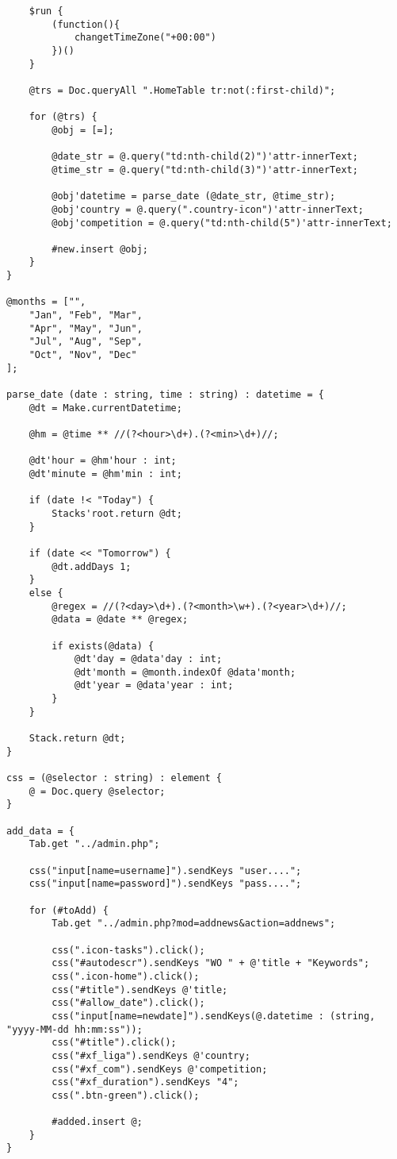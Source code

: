 \begin{lstlisting}
	$run {
		(function(){
			changetTimeZone("+00:00")
		})()
	}

	@trs = Doc.queryAll ".HomeTable tr:not(:first-child)";

	for (@trs) {
		@obj = [=];

		@date_str = @.query("td:nth-child(2)")'attr-innerText;
		@time_str = @.query("td:nth-child(3)")'attr-innerText;

		@obj'datetime = parse_date (@date_str, @time_str);
		@obj'country = @.query(".country-icon")'attr-innerText;
		@obj'competition = @.query("td:nth-child(5")'attr-innerText;

		#new.insert @obj;
	}
}

@months = ["",
	"Jan", "Feb", "Mar",
	"Apr", "May", "Jun",
	"Jul", "Aug", "Sep",
	"Oct", "Nov", "Dec"
];

parse_date (date : string, time : string) : datetime = {
	@dt = Make.currentDatetime;

	@hm = @time ** //(?<hour>\d+).(?<min>\d+)//;

	@dt'hour = @hm'hour : int;
	@dt'minute = @hm'min : int;

	if (date !< "Today") {
		Stacks'root.return @dt;
	}

	if (date << "Tomorrow") {
		@dt.addDays 1;
	}
	else {
		@regex = //(?<day>\d+).(?<month>\w+).(?<year>\d+)//;
		@data = @date ** @regex;

		if exists(@data) {
			@dt'day = @data'day : int;
			@dt'month = @month.indexOf @data'month;
			@dt'year = @data'year : int;
		}
	}

	Stack.return @dt;
}

css = (@selector : string) : element {
	@ = Doc.query @selector;
}

add_data = {
	Tab.get "../admin.php";

	css("input[name=username]").sendKeys "user....";
	css("input[name=password]").sendKeys "pass....";

	for (#toAdd) {
		Tab.get "../admin.php?mod=addnews&action=addnews";

		css(".icon-tasks").click();
		css("#autodescr").sendKeys "WO " + @'title + "Keywords";
		css(".icon-home").click();
		css("#title").sendKeys @'title;
		css("#allow_date").click();
		css("input[name=newdate]").sendKeys(@.datetime : (string, "yyyy-MM-dd hh:mm:ss"));
		css("#title").click();
		css("#xf_liga").sendKeys @'country;
		css("#xf_com").sendKeys @'competition;
		css("#xf_duration").sendKeys "4";
		css(".btn-green").click();

		#added.insert @;
	}
}


\end{lstlisting}
